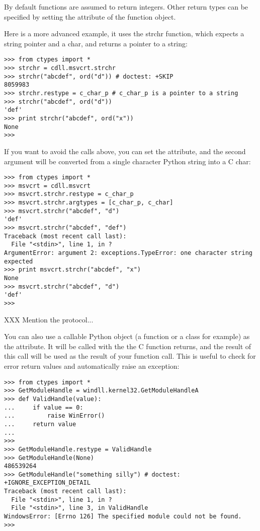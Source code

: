 By default functions are assumed to return integers.  Other return
types can be specified by setting the  attribute of the
function object.

Here is a more advanced example, it uses the strchr function, which
expects a string pointer and a char, and returns a pointer to a
string:
\begin{verbatim}
>>> from ctypes import *
>>> strchr = cdll.msvcrt.strchr
>>> strchr("abcdef", ord("d")) # doctest: +SKIP
8059983
>>> strchr.restype = c_char_p # c_char_p is a pointer to a string
>>> strchr("abcdef", ord("d"))
'def'
>>> print strchr("abcdef", ord("x"))
None
>>>
\end{verbatim}

If you want to avoid the  calls above, you can set the
 attribute, and the second argument will be converted from
a single character Python string into a C char:
\begin{verbatim}
>>> from ctypes import *
>>> msvcrt = cdll.msvcrt
>>> msvcrt.strchr.restype = c_char_p
>>> msvcrt.strchr.argtypes = [c_char_p, c_char]
>>> msvcrt.strchr("abcdef", "d")
'def'
>>> msvcrt.strchr("abcdef", "def")
Traceback (most recent call last):
  File "<stdin>", line 1, in ?
ArgumentError: argument 2: exceptions.TypeError: one character string expected
>>> print msvcrt.strchr("abcdef", "x")
None
>>> msvcrt.strchr("abcdef", "d")
'def'
>>>
\end{verbatim}

XXX Mention the  protocol...

You can also use a callable Python object (a function or a class for
example) as the  attribute.  It will be called with the
 the C function returns, and the result of this call will
be used as the result of your function call. This is useful to check
for error return values and automatically raise an exception:
\begin{verbatim}
>>> from ctypes import *
>>> GetModuleHandle = windll.kernel32.GetModuleHandleA
>>> def ValidHandle(value):
...     if value == 0:
...         raise WinError()
...     return value
...
>>>
>>> GetModuleHandle.restype = ValidHandle
>>> GetModuleHandle(None)
486539264
>>> GetModuleHandle("something silly") # doctest: +IGNORE_EXCEPTION_DETAIL
Traceback (most recent call last):
  File "<stdin>", line 1, in ?
  File "<stdin>", line 3, in ValidHandle
WindowsError: [Errno 126] The specified module could not be found.
>>>
\end{verbatim}


